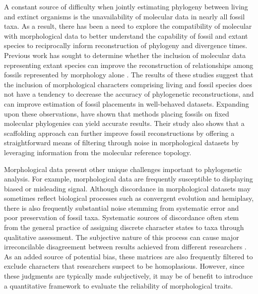 \documentclass[12pt]{article}
\begin{document}
A constant source of difficulty when jointly estimating phylogeny between living
and extinct organisms is the unavailability of molecular data in nearly
all fossil taxa. As a result, there has been a need to explore the
compatibility of molecular with morphological data to better understand
the capability of fossil and extant species to reciprocally inform
reconstruction of phylogeny and divergence times. Previous work has
sought to determine whether the inclusion of molecular data representing
extant species can improve the reconstruction of relationships among
fossils represented by morphology alone \citep{wiens2009paleontology,wiens2010combining}. The results
of these studies suggest that the inclusion of morphological characters
comprising living and fossil species does not have a tendency to
decrease the accuracy of phylogenetic reconstructions, and can improve
estimation of fossil placements in well-behaved datasets. Expanding upon
these observations, \cite{berger2010fossilplacement} have shown that methods
placing fossils on fixed molecular phylogenies can yield accurate
results. Their study also shows that a scaffolding approach can further improve fossil reconstructions 
by offering a straightforward means of filtering through noise in morphological datasets
by leveraging information from the molecular reference topology.

Morphological data present other unique challenges important to phylogenetic analysis. For example, morphological data are frequently susceptible to
displaying biased or misleading signal. Although discordance in morphological datasets may sometimes reflect biological processes such as convergent evolution and hemiplasy, there is also frequently substantial noise stemming from systematic error and poor preservation of fossil taxa. Systematic sources of discordance often stem from
the general practice of assigning discrete character states to taxa
through qualitative assessment. The subjective nature of this process
can cause major irreconcilable disagreement between results achieved
from different researchers \citep{hauser1991effect,pleijel1995character,wilkinson1995comparison,
hawkins1997primary,scotland2000homology,scotland2003phylogeny,brazeau2011problematic,simoes2017giant}. As an added source of
potential bias, these matrices are also frequently filtered to exclude
 characters that researchers suspect to be homoplasious. However,
 since these judgments are typically made subjectively, it may be of
 benefit to introduce a quantitative framework to evaluate the reliability
 of morphological traits.
\end{document}
